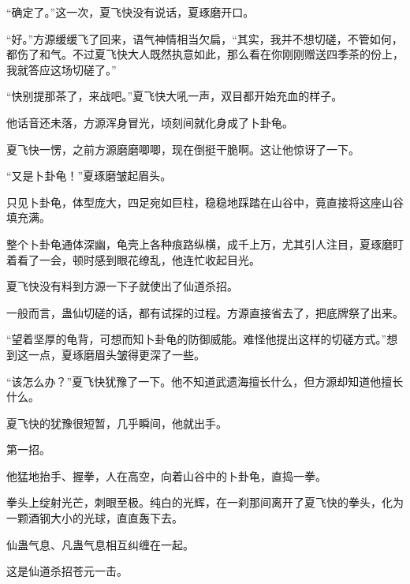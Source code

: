 \begin{this_body}
“确定了。”这一次，夏飞快没有说话，夏琢磨开口。

“好。”方源缓缓飞了回来，语气神情相当欠扁，“其实，我并不想切磋，不管如何，都伤了和气。不过夏飞快大人既然执意如此，那么看在你刚刚赠送四季茶的份上，我就答应这场切磋了。”

“快别提那茶了，来战吧。”夏飞快大吼一声，双目都开始充血的样子。

他话音还未落，方源浑身冒光，顷刻间就化身成了卜卦龟。

夏飞快一愣，之前方源磨磨唧唧，现在倒挺干脆啊。这让他惊讶了一下。

“又是卜卦龟！”夏琢磨皱起眉头。

只见卜卦龟，体型庞大，四足宛如巨柱，稳稳地踩踏在山谷中，竟直接将这座山谷填充满。

整个卜卦龟通体深幽，龟壳上各种痕路纵横，成千上万，尤其引人注目，夏琢磨盯着看了一会，顿时感到眼花缭乱，他连忙收起目光。

夏飞快没有料到方源一下子就使出了仙道杀招。

一般而言，蛊仙切磋的话，都有试探的过程。方源直接省去了，把底牌祭了出来。

“望着坚厚的龟背，可想而知卜卦龟的防御威能。难怪他提出这样的切磋方式。”想到这一点，夏琢磨眉头皱得更深了一些。

“该怎么办？”夏飞快犹豫了一下。他不知道武遗海擅长什么，但方源却知道他擅长什么。

夏飞快的犹豫很短暂，几乎瞬间，他就出手。

第一招。

他猛地抬手、握拳，人在高空，向着山谷中的卜卦龟，直捣一拳。

拳头上绽射光芒，刺眼至极。纯白的光辉，在一刹那间离开了夏飞快的拳头，化为一颗酒钢大小的光球，直直轰下去。

仙蛊气息、凡蛊气息相互纠缠在一起。

这是仙道杀招苍元一击。

\end{this_body}

